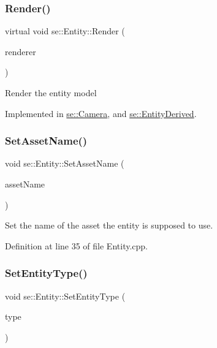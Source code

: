 \subsubsection{\texorpdfstring{Render()}{Render()}}
{\footnotesize\ttfamily virtual void se\+::\+Entity\+::\+Render (\begin{DoxyParamCaption}\item[{\mbox{\hyperlink{classse_1_1_abstract_renderer}{Abstract\+Renderer}} $\ast$}]{renderer }\end{DoxyParamCaption})\hspace{0.3cm}{\ttfamily [pure virtual]}}

Render the entity model 

Implemented in \mbox{\hyperlink{classse_1_1_camera_accc1f78d52fca1e68c5267fbc0fef239}{se\+::\+Camera}}, and \mbox{\hyperlink{classse_1_1_entity_derived_a2fdb1127cda675ae9a69eb17bc95cfae}{se\+::\+Entity\+Derived}}.

\mbox{\label{classse_1_1_entity_a4fcf5639a2e6e74e0b12893e70a46a83}} 
\subsubsection{\texorpdfstring{Set\+Asset\+Name()}{SetAssetName()}}
{\footnotesize\ttfamily void se\+::\+Entity\+::\+Set\+Asset\+Name (\begin{DoxyParamCaption}\item[{const std\+::string \&}]{asset\+Name }\end{DoxyParamCaption})\hspace{0.3cm}{\ttfamily [virtual]}}

Set the name of the asset the entity is supposed to use. 

Definition at line 35 of file Entity.\+cpp.

\mbox{\label{classse_1_1_entity_a0550faa593742dbd41284971c24c410e}} 
\subsubsection{\texorpdfstring{Set\+Entity\+Type()}{SetEntityType()}}
{\footnotesize\ttfamily void se\+::\+Entity\+::\+Set\+Entity\+Type (\begin{DoxyParamCaption}\item[{\mbox{\hyperlink{namespacese_ae73a909a94998bc95235eb9b16e405f1}{Entity\+Type}}}]{type }\end{DoxyParamCaption})\hspace{0.3cm}{\ttfamily [virtual]}}

